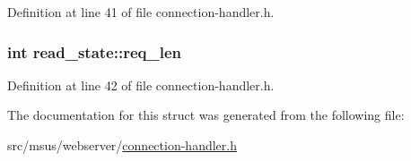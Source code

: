 Definition at line 41 of file connection-\/handler.\-h.

\hypertarget{structread__state_a5629ae045b84454938394c8af94124d1}{
\subsubsection[{req\-\_\-len}]{\setlength{\rightskip}{0pt plus 5cm}int read\-\_\-state\-::req\-\_\-len}}\label{structread__state_a5629ae045b84454938394c8af94124d1}


Definition at line 42 of file connection-\/handler.\-h.



The documentation for this struct was generated from the following file\-:\begin{DoxyCompactItemize}
\item 
src/msus/webserver/\hyperlink{connection-handler_8h}{connection-\/handler.\-h}\end{DoxyCompactItemize}
